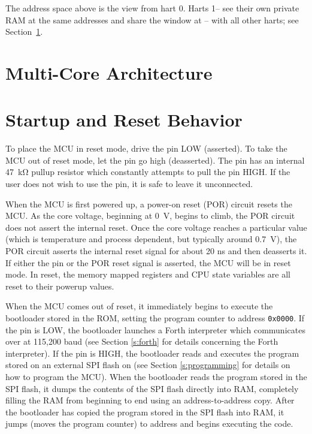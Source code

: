 \documentclass[11pt,pdftex,portrait,letterpaper]{article}
\begin{document}
The address space above is the view from hart 0. Harts 1--\MaxHartIndex{} see their own private RAM at the same addresses and share the window at \texttt{\SharedWindowStartAddress}--\texttt{\SharedWindowEndAddress} with all other harts; see Section~\ref{s:multicore}.

\newpage



\section{Multi-Core Architecture} \label{s:multicore}



\newpage



\section{Startup and Reset Behavior} \label{s:startup}
To place the MCU in reset mode, drive the  pin LOW (asserted). To take the MCU out of reset mode, let the  pin go high (deasserted). The  pin has an internal 47~\si{\kilo\ohm} pullup resistor which constantly attempts to pull the  pin HIGH. If the user does not wish to use the  pin, it is safe to leave it unconnected.

When the MCU is first powered up, a power-on reset (POR) circuit resets the MCU. As the core voltage, beginning at 0~V, begins to climb, the POR circuit does not assert the internal reset. Once the core voltage reaches a particular value (which is temperature and process dependent, but typically around 0.7~V), the POR circuit asserts the internal reset signal for about 20 ns and then deasserts it. If either the  pin or the POR reset signal is asserted, the MCU will be in reset mode. In reset, the memory mapped registers and CPU state variables are all reset to their powerup values.

When the MCU comes out of reset, it immediately begins to execute the bootloader stored in the ROM, setting the program counter to address \texttt{0x0000}. If the  pin is LOW, the bootloader launches a Forth interpreter which communicates over  at 115,200 baud (see Section \ref{s:forth} for details concerning the Forth interpreter). If the  pin is HIGH, the bootloader reads and executes the program stored on an external SPI flash on  (see Section \ref{s:programming} for details on how to program the MCU). When the bootloader reads the program stored in the SPI flash, it dumps the contents of the SPI flash directly into RAM, completely filling the RAM from beginning to end using an address-to-address copy. After the bootloader has copied the program stored in the SPI flash into RAM, it jumps (moves the program counter) to address \texttt{\RamProgramStartAddress} and begins executing the code.
\end{document}
